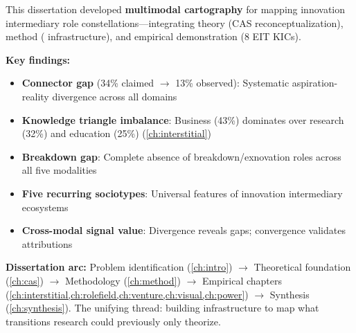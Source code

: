 \documentclass[../main.tex]{subfiles}
\begin{document}
\begin{summarybox}
This dissertation developed \textbf{multimodal cartography} for mapping innovation intermediary role constellations---integrating theory (CAS reconceptualization), method (\RoleBox{} infrastructure), and empirical demonstration (8 EIT KICs).

\vspace{0.5em}
\textbf{Key findings:}
\begin{itemize}[leftmargin=*, itemsep=0.2em]
\item \textbf{Connector gap} (34\% claimed $\rightarrow$ 13\% observed): Systematic aspiration-reality divergence across all domains
\item \textbf{Knowledge triangle imbalance}: Business (43\%) dominates over research (32\%) and education (25\%) (\cref{ch:interstitial})
\item \textbf{Breakdown gap}: Complete absence of breakdown/exnovation roles across all five modalities
\item \textbf{Five recurring sociotypes}: Universal features of innovation intermediary ecosystems
\item \textbf{Cross-modal signal value}: Divergence reveals gaps; convergence validates attributions
\end{itemize}

\vspace{0.5em}
\textbf{Dissertation arc:} Problem identification (\cref{ch:intro}) $\rightarrow$ Theoretical foundation (\cref{ch:cas}) $\rightarrow$ Methodology (\cref{ch:method}) $\rightarrow$ Empirical chapters (\cref{ch:interstitial,ch:rolefield,ch:venture,ch:visual,ch:power}) $\rightarrow$ Synthesis (\cref{ch:synthesis}). The unifying thread: building infrastructure to map what transitions research could previously only theorize.
\end{summarybox}
\end{document}
